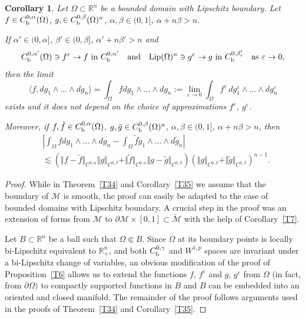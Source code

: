 \documentclass[intlimits,12pt,reqno]{amsart}
\newcommand{\cM}{\mathcal M}
\newcommand{\bbbr}{\mathbb R}
\newcommand{\R}{\mathbb R}
\newcommand{\eps}{\varepsilon}
\numberwithin{equation}{section}
\def\lip{\operatorname{Lip}}
\newtheorem{corollary}[theorem]{Corollary}
\theoremstyle{definition}
\begin{document}
\begin{corollary}
\label{T72}
Let $\Omega\subset\R^n$ be a bounded domain with Lipschitz boundary. 
Let 
$f\in C_{\rm b}^{0,\alpha}(\Omega)$, 
$g,\in C_{\rm b}^{0,\beta}(\Omega)^n$, $\alpha,\beta\in (0,1]$,
$\alpha+n\beta>n$.

If $\alpha'\in (0,\alpha]$, $\beta'\in(0,\beta]$, $\alpha'+n\beta'>n$ and
\begin{equation}
\label{eq75}
\text{$C_{\rm b}^{0,\alpha'}(\Omega)\ni f^\eps\to f$ in $C_{\rm b}^{0,\alpha'}$}
\quad
\text{and}
\quad
\text{$\lip({\Omega})^n\ni g^\eps\to g$ in $C_{\rm b}^{0,\beta_i'}$}
\quad
\text{as $\eps\to 0$,}
\end{equation}
then the limit
\begin{equation}
\label{eq76}
\langle f,dg_1\wedge\ldots\wedge dg_n\rangle=
\int_{\Omega} f dg_1\wedge\ldots\wedge dg_n:=\lim_{\eps\to 0} \int_{\Omega}f^\eps\, dg_1^\eps\wedge\ldots\wedge dg_n^\eps
\end{equation}
exists and it does not depend on the choice of approximations $f^\eps$, $g^\eps$.

Moreover, if $f,\tilde{f}\in C_{\rm b}^{0,\alpha}(\Omega)$, 
$g,\tilde{g}\in C_{\rm b}^{0,\beta}(\Omega)^n$, $\alpha,\beta\in (0,1]$,
$\alpha+n\beta>n$, then
\begin{align*}
&\left|\int_{\Omega} fdg_1\wedge\ldots\wedge dg_n-\int_{\Omega}\tilde{f}\tilde{g}_1\wedge\ldots\wedge d\tilde{g}_n\right|\\
&\lesssim
\left(\Vert f-\tilde{f}\Vert_{C^{0,\alpha}}\Vert g\Vert_{C^{0,\beta}}
+\Vert\tilde{f}\Vert_{C^{0,\alpha}}\Vert g-\tilde{g}\Vert_{C^{0,\beta}}\right)
\left(\Vert g\Vert_{C^{0,\beta}}+\Vert \tilde{g}\Vert_{C^{0,\beta}}\right)^{n-1}.
\end{align*}
\end{corollary}
\begin{proof}
While in Theorem~\ref{T34} and Corollary~\ref{T35} we assume that the boundary of $\cM$ is smooth, the proof can easily be adapted to the case of bounded domains with Lipschitz boundary. A crucial step in the proof was an extension of forms from $\cM$ to $\partial\cM\times [0,1]\subset\widetilde{\cM}$ with the help of Corollary~\ref{T7}.

Let $B\subset\bbbr^n$ be a ball such that $\Omega\Subset B$. Since $\Omega$ at its boundary points is locally bi-Lipschitz equivalent to $\bbbr^n _{+}$, and  both $C_{\rm b}^{0,\gamma}$ and $W^{1,p}$ spaces are invariant under a bi-Lipschitz change of variables, 
an obvious modification of the proof of Proposition~\ref{T6} allows us to extend the 
functions $f$, $f^\eps$ and $g$, $g^\eps$ from $\Omega$ (in fact, from $\partial\Omega)$
to compactly supported functions in $B$ and $B$ can be embedded into an oriented and closed manifold. The remainder of the proof follows arguments used in the proofs of Theorem~\ref{T34} and Corollary~\ref{T35}.
\end{proof}
\end{document}
